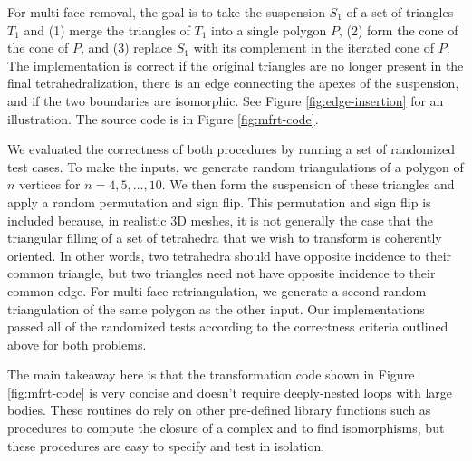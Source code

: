 \documentclass[twocolumn,leqno,twocolumn]{article}
\begin{document}
For multi-face removal, the goal is to take the suspension $S_1$ of a set of triangles $T_1$ and (1) merge the triangles of $T_1$ into a single polygon $P$, (2) form the cone of the cone of $P$, and (3) replace $S_1$ with its complement in the iterated cone of $P$.
The implementation is correct if the original triangles are no longer present in the final tetrahedralization, there is an edge connecting the apexes of the suspension, and if the two boundaries are isomorphic.
See Figure \ref{fig:edge-insertion} for an illustration.
The source code is in Figure \ref{fig:mfrt-code}.

We evaluated the correctness of both procedures by running a set of randomized test cases.
To make the inputs, we generate random triangulations of a polygon of $n$ vertices for $n = 4, 5, \ldots, 10$.
We then form the suspension of these triangles and apply a random permutation and sign flip.
This permutation and sign flip is included because, in realistic 3D meshes, it is not generally the case that the triangular filling of a set of tetrahedra that we wish to transform is coherently oriented.
In other words, two tetrahedra should have opposite incidence to their common triangle, but two triangles need not have opposite incidence to their common edge.
For multi-face retriangulation, we generate a second random triangulation of the same polygon as the other input.
Our implementations passed all of the randomized tests according to the correctness criteria outlined above for both problems.

The main takeaway here is that the transformation code shown in Figure \ref{fig:mfrt-code} is very concise and doesn't require deeply-nested loops with large bodies.
These routines do rely on other pre-defined library functions such as procedures to compute the closure of a complex and to find isomorphisms, but these procedures are easy to specify and test in isolation.
\end{document}
